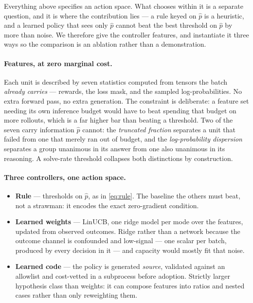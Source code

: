 Everything above specifies an action space. What chooses within it is a separate question,
and it is where the contribution lies --- a rule keyed on $\hat p$ is a heuristic, and a
learned policy that sees only $\hat p$ cannot beat the best threshold on $\hat p$ by more
than noise. We therefore give the controller features, and instantiate it three ways so the
comparison is an ablation rather than a demonstration.

\paragraph{Features, at zero marginal cost.} Each unit is described by seven statistics
computed from tensors the batch \emph{already carries} --- rewards, the loss mask, and the
sampled log-probabilities. No extra forward pass, no extra generation. The constraint is
deliberate: a feature set needing its own inference budget would have to beat spending that
budget on more rollouts, which is a far higher bar than beating a threshold. Two of the seven
carry information $\hat p$ cannot: the \emph{truncated fraction} separates a unit that failed
from one that merely ran out of budget, and the \emph{log-probability dispersion} separates a
group unanimous in its answer from one also unanimous in its reasoning. A solve-rate
threshold collapses both distinctions by construction.

\paragraph{Three controllers, one action space.}
%
\begin{itemize}
  \item \textbf{Rule} --- thresholds on $\hat p$, as in \eqref{eq:rule}. The baseline the
        others must beat, not a strawman: it encodes the exact zero-gradient condition.
  \item \textbf{Learned weights} --- LinUCB, one ridge model per mode over the features,
        updated from observed outcomes. Ridge rather than a network because the outcome
        channel is confounded and low-signal --- one scalar per batch, produced by every
        decision in it --- and capacity would mostly fit that noise.
  \item \textbf{Learned code} --- the policy is generated \emph{source}, validated against an
        allowlist and cost-vetted in a subprocess before adoption. Strictly larger
        hypothesis class than weights: it can compose features into ratios and nested cases
        rather than only reweighting them.
\end{itemize}
%

